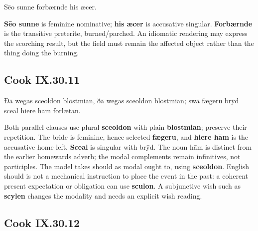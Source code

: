 \par\begin{minipage}{\linewidth}\raggedright
Sēo sunne forbærnde his æcer.

\textbf{Sēo sunne} is feminine nominative; \textbf{his æcer} is accusative singular. \textbf{Forbærnde} is the transitive preterite, burned/\allowbreak{}parched. An idiomatic rendering may express the scorching result, but the field must remain the affected object rather than the thing doing the burning.

\end{minipage}\par\addvspace{4pt}

\subsection*{Cook IX.30.11}

\par\begin{minipage}{\linewidth}\raggedright
Ðā wegas sceoldon blōstmian, ðā wegas sceoldon blōstmian; swā fægeru brȳd sceal hiere hām forlǣtan.

Both parallel clauses use plural \textbf{sceoldon} with plain \textbf{blōstmian}; preserve their repetition. The bride is feminine, hence selected \textbf{fægeru}, and \textbf{hiere hām} is the accusative home left. \textbf{Sceal} is singular with brȳd. The noun hām is distinct from the earlier homewards adverb; the modal complements remain infinitives, not participles. The model takes should as modal ought to, using \textbf{sceoldon}. English should is not a mechanical instruction to place the event in the past: a coherent present expectation or obligation can use \textbf{sculon}. A subjunctive wish such as \textbf{scylen} changes the modality and needs an explicit wish reading.

\end{minipage}\par\addvspace{4pt}

\subsection*{Cook IX.30.12}

